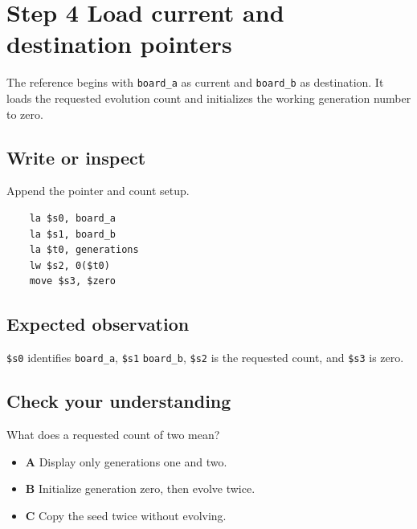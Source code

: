 \section{Step 4 Load current and destination
  pointers}\label{008-life-generations-s04-step-4-load-current-and-destination-pointers}

The reference begins with \texttt{board\_a} as current and
\texttt{board\_b} as destination. It loads the requested evolution count
and initializes the working generation number to zero.

\subsection{Write or
  inspect}\label{008-life-generations-s04-write-or-inspect}

Append the pointer and count setup.

\begin{verbatim}
    la $s0, board_a
    la $s1, board_b
    la $t0, generations
    lw $s2, 0($t0)
    move $s3, $zero
\end{verbatim}

\subsection{Expected
  observation}\label{008-life-generations-s04-expected-observation}

\texttt{\$s0} identifies \texttt{board\_a}, \texttt{\$s1}
\texttt{board\_b}, \texttt{\$s2} is the requested count, and
\texttt{\$s3} is zero.

\subsection{Check your
  understanding}\label{008-life-generations-s04-check-your-understanding}

What does a requested count of two mean?

\begin{itemize}
  \tightlist
  \item
        \textbf{A} Display only generations one and two.
  \item
        \textbf{B} Initialize generation zero, then evolve twice.
  \item
        \textbf{C} Copy the seed twice without evolving.
\end{itemize}
